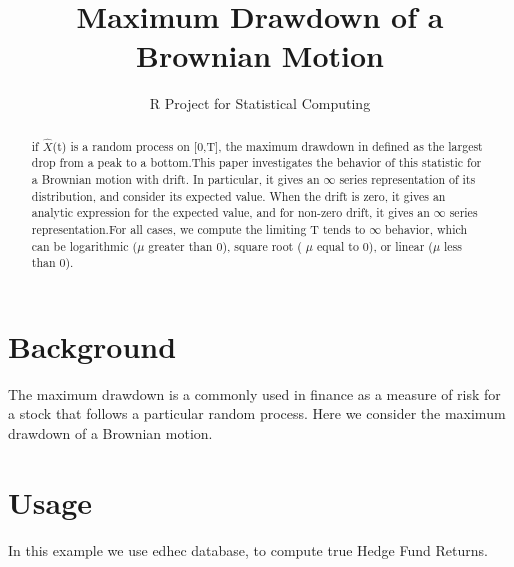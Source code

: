 \documentclass[12pt,letterpaper,english]{article}
\title{Maximum Drawdown of a Brownian Motion}
\author{R Project for Statistical Computing}
\begin{document}


\maketitle


\begin{abstract}
if $\hat{X}$(t) is a random process on [0,T], the maximum drawdown in defined as the largest drop from a peak to a bottom.This paper investigates the behavior of this statistic for a Brownian motion with drift. In particular, it gives an  $\infty$ series representation of its distribution, and consider its expected value. When the drift is zero, it gives an analytic expression for the expected value, and for non-zero drift, it gives an  $\infty$ series representation.For all cases, we compute the limiting  T tends to $\infty$ behavior, which can be
logarithmic ($\mu$ greater than 0), square root ( $\mu$ equal to 0), or linear ($\mu$ less than 0).  
\end{abstract}



\section{Background}

The maximum drawdown is a commonly used in finance as a measure of risk for a stock that follows a particular random process. Here we consider the maximum drawdown of a Brownian motion.


\section{Usage}

In this example we use edhec database, to compute true Hedge Fund Returns.
\end{document}
